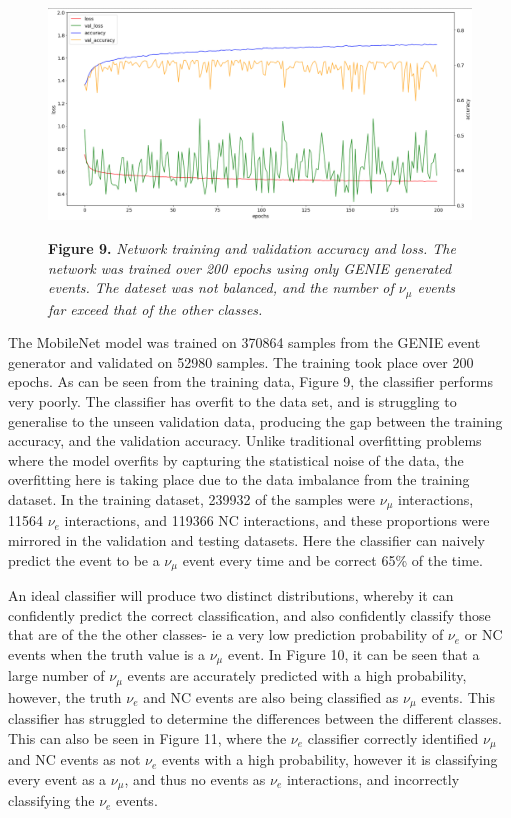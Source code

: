 \begin{figure}[t!]
 \centering
 \includegraphics[width=160mm]{genie/acc_loss.png}
 
 \textbf{Figure 9.} \textit{Network training and validation accuracy and loss. The network was trained over 200 epochs using only GENIE generated events. The dateset was not balanced, and the number of $\nu_\mu$ events far exceed that of the other classes. }
\end{figure}

\noindent The MobileNet model was trained on 370864 samples from the GENIE event generator and validated on 52980 samples. The training took place over 200 epochs. As can be seen from the training data, Figure 9, the classifier performs very poorly. The classifier has overfit to the data set, and is struggling to generalise to the unseen validation data, producing the gap between the training accuracy, and the validation accuracy. Unlike traditional overfitting problems where the model overfits by capturing the statistical noise of the data, the overfitting here is taking place due to the data imbalance from the training dataset. In the training dataset, 239932 of the samples were $\nu_\mu$ interactions, 11564 $\nu_e$ interactions, and 119366 NC interactions, and these proportions were mirrored in the validation and testing datasets. Here the classifier can naively predict the event to be a $\nu_\mu$ event every time and be correct 65\% of the time.\medskip

\noindent An ideal classifier will produce two distinct distributions, whereby it can confidently predict the correct classification, and also confidently classify those that are of the the other classes- ie a very low prediction probability of $\nu_e$ or NC events when the truth value is a $\nu_\mu$ event. In Figure 10, it can be seen that a large number of $\nu_\mu$ events are accurately predicted with a high probability, however, the truth $\nu_e$ and NC events are also being classified as $\nu_\mu$ events. This classifier has struggled to determine the differences between the different classes. This can also be seen in Figure 11, where the $\nu_e$ classifier correctly identified $\nu_\mu$ and NC events as not $\nu_e$ events with a high probability, however it is classifying every event as a $\nu_\mu$, and thus no events as $\nu_e$ interactions, and incorrectly classifying the $\nu_e$ events.\medskip

